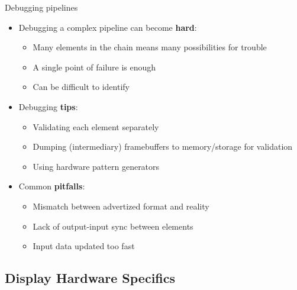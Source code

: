 \begin{frame}{Debugging pipelines}
  \begin{itemize}
  \item Debugging a complex pipeline can become \textbf{hard}:
    \begin{itemize}
    \item Many elements in the chain means many possibilities for trouble
    \item A single point of failure is enough
    \item Can be difficult to identify
    \end{itemize}
  \item Debugging \textbf{tips}:
    \begin{itemize}
    \item Validating each element separately
    \item Dumping (intermediary) framebuffers to memory/storage for validation
    \item Using hardware pattern generators
    \end{itemize}
  \item Common \textbf{pitfalls}:
    \begin{itemize}
    \item Mismatch between advertized format and reality
    \item Lack of output-input sync between elements
    \item Input data updated too fast
    \end{itemize}
  \end{itemize}
\end{frame}

\subsection{Display Hardware Specifics}

